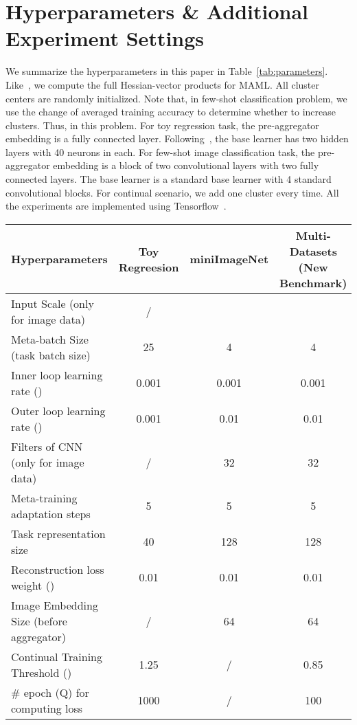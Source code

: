 \documentclass{article}
\begin{document}
\section{Hyperparameters \& Additional Experiment Settings}
We summarize the hyperparameters in this paper in Table~\ref{tab:parameters}. Like~\cite{finn2017model}, we compute the full Hessian-vector products for MAML. All cluster centers are randomly initialized. Note that, in few-shot classification problem, we use the change of averaged training accuracy to determine whether to increase clusters. Thus,  in this problem. For toy regression task, the pre-aggregator embedding  is a fully connected layer. Following~\cite{finn2017model}, the base learner has two hidden layers with 40 neurons in each. For few-shot image classification task, the pre-aggregator embedding  is a block of two convolutional layers with two fully connected layers. The base learner is a standard base learner with 4 standard convolutional blocks. For continual scenario, we add one cluster every time. All the experiments are implemented using Tensorflow~\cite{abadi2016tensorflow}.
\begin{table*}[h]
\caption{Hyperparameter summary}
\label{tab:parameters}
\begin{center}
\begin{tabular}{l|c|c|c}
\hline
Hyperparameters & Toy Regreesion & miniImageNet & Multi-Datasets (New Benchmark) \\\hline
Input Scale (only for image data) & / &  &  \\
Meta-batch Size (task batch size) & 25 & 4 & 4\\
Inner loop learning rate () & 0.001 & 0.001 & 0.001\\
Outer loop learning rate () & 0.001 & 0.01 & 0.01\\
Filters of CNN (only for image data) & / & 32 & 32\\
Meta-training adaptation steps & 5 & 5 & 5\\
Task representation size & 40 & 128 & 128\\
Reconstruction loss weight () & 0.01 & 0.01 & 0.01\\
Image Embedding Size (before aggregator) & / & 64 & 64\\
Continual Training Threshold () & 1.25 & / & 0.85\\
\# epoch (Q) for computing loss & 1000 & / & 100 \\
\hline
\end{tabular}
\end{center}
\end{table*}
\label{app:para}
\end{document}
